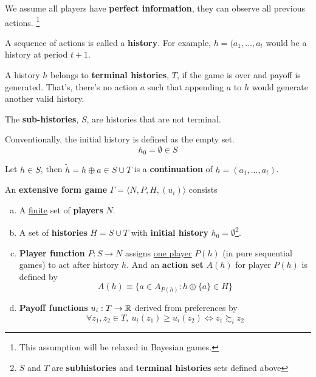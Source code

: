 \documentclass[11pt]{article}
\begin{document}
			\begin{assumption}
				We assume all players have \textbf{perfect information}, they can observe all previous actions. \footnote{This assumption will be relaxed in Bayesian games.}
			\end{assumption}
			
			\begin{definition}
				A sequence of actions is called a \textbf{history}. For example, $h = (a_1,\dots, a_t$ would be a history at period $t+1$.
			\end{definition}
			
			\begin{definition}
				A history $h$ belongs to \textbf{terminal histories}, $T$, if the game is over and payoff is generated. That's, there's no action $a$ such that appending $a$ to $h$ would generate another valid history.
			\end{definition}
			
			\begin{definition}
				The \textbf{sub-histories}, $S$, are histories that are not terminal.
			\end{definition}
			
			\begin{definition}
				Conventionally, the initial history is defined as the empty set.
				\begin{equation}
					h_0 = \emptyset \in S
				\end{equation}
			\end{definition}
			
			\begin{definition}
				Let $h \in S$, then $\tilde{h} = h \oplus a \in S \cup T$ is a \textbf{continuation} of $h = (a_1, \dots, a_t)$.
			\end{definition}
			
			\begin{definition}
				An \textbf{extensive form game} $\Gamma = \langle N, P, H, (u_i) \rangle$ consists
				\begin{enumerate}[(a)]
					\item A \ul{finite} set of \textbf{players} $N$.
					\item A set of \textbf{histories} $H = S \cup T$ with \textbf{initial history} $h_0 = \emptyset$\footnote{$S$ and $T$ are \textbf{subhistories} and \textbf{terminal histories} sets defined above}.
					\item \textbf{Player function} $P: S \to N$ assigns \ul{one player} $P(h)$ (in pure sequential games) to act after history $h$. And an \textbf{action set} $A(h)$ for player $P(h)$ is defined by
						\begin{equation}
							A(h) \equiv \{a \in A_{P(h)}: h \oplus \{a\} \in H\}
						\end{equation}
					\item \textbf{Payoff functions} $u_i: T \to \mathbb{R}$ derived from preferences by
						\begin{equation}
							\forall z_1, z_2 \in T,\ u_i(z_1) \geq u_i(z_2) \iff z_1 \succsim_i z_2
						\end{equation}
				\end{enumerate}
			\end{definition}
			
\end{document}
